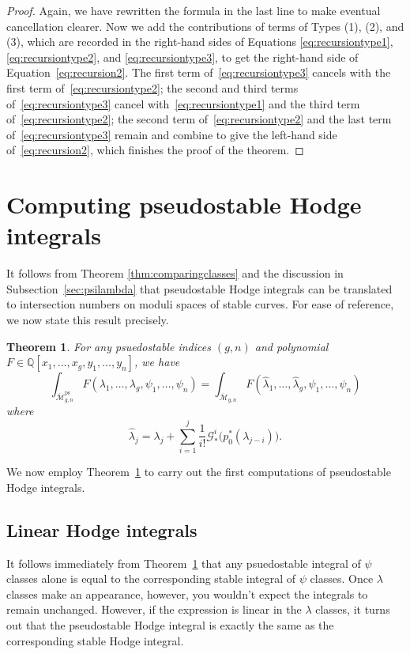 \documentclass[12pt]{amsart}
\newtheorem{theorem}[equation]{Theorem}
\theoremstyle{definition}
\newcommand{\M}{\overline{\mathcal{M}}}
\newcommand{\ps}{\mathrm{ps}}
\newcommand{\G}{\mathcal{G}}
\newcommand{\Q}{\mathbb{Q}}
\numberwithin{equation}{section}
\begin{document}
\begin{proof}
Again, we have rewritten the formula in the last line to make eventual cancellation clearer.  Now we add the contributions of terms of Types (1), (2), and (3), which are recorded in the right-hand sides of Equations \eqref{eq:recursiontype1}, \eqref{eq:recursiontype2}, and \eqref{eq:recursiontype3}, to get the right-hand side of Equation~\eqref{eq:recursion2}.  The first term of~\eqref{eq:recursiontype3} cancels with the first term of~\eqref{eq:recursiontype2}; the second and third terms of~\eqref{eq:recursiontype3} cancel with~\eqref{eq:recursiontype1} and the third term of~\eqref{eq:recursiontype2}; the second term of~\eqref{eq:recursiontype2} and the last term of~\eqref{eq:recursiontype3} remain and combine to give the left-hand side of~\eqref{eq:recursion2}, which finishes the proof of the theorem.
\end{proof}

\section{Computing pseudostable Hodge integrals}

It follows from Theorem \ref{thm:comparingclasses} and the discussion in Subsection~\ref{sec:psilambda} that pseudostable Hodge integrals can be translated to intersection numbers on moduli spaces of stable curves. For ease of reference, we now state this result precisely.

\begin{theorem}\label{thm:translation}
For any psuedostable indices $(g,n)$ and polynomial $F\in\Q[x_1,\dots,x_g,y_1,\dots,y_n]$, we have
\[
\int_{\M_{g,n}^\ps}F(\lambda_1,\dots,\lambda_g,\psi_1,\dots,\psi_n)=\int_{\M_{g,n}}F(\hat\lambda_1,\dots,\hat\lambda_g,\psi_1,\dots,\psi_n)
\]
where
\[
\hat\lambda_j=\lambda_j+\sum_{i=1}^j\frac{1}{i!}\G^i_*\big(p_0^*(\lambda_{j-i})\big).
\]
\end{theorem}

We now employ Theorem~\ref{thm:translation} to carry out the first computations of pseudostable Hodge integrals. 

\subsection{Linear Hodge integrals}

It follows immediately from Theorem~\ref{thm:translation} that any psuedostable integral of $\psi$ classes alone is equal to the corresponding stable integral of $\psi$ classes. Once $\lambda$ classes make an appearance, however, you wouldn't expect the integrals to remain unchanged. However, if the expression is linear in the $\lambda$ classes, it turns out that the pseudostable Hodge integral is exactly the same as the corresponding stable Hodge integral.
\end{document}
